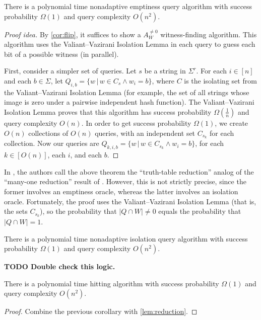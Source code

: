 \documentclass{article}
\newcommand{\todo}[1]{\textbf{TODO #1}}
\begin{document}
\begin{theorem}
  There is a polynomial time nonadaptive emptiness query algorithm with success probability $\Omega(1)$ and query complexity $O(n^2)$.
\end{theorem}
\begin{proof}[Proof idea]
  By \autoref{cor:flip}, it suffices to show a $A_W^{\neq 0}$ witness-finding algorithm.
  This algorithm uses the Valiant--Vazirani Isolation Lemma in each query to guess each bit of a possible witness (in parallel).

  First, consider a simpler set of queries.
  Let $s$ be a string in $\Sigma^r$.
  For each $i \in [n]$ and each $b \in \Sigma$, let $Q_{i, b} = \{ w \, | \, w \in C_s \land w_i = b\}$, where $C$ is the isolating set from the Valiant--Vazirani Isolation Lemma (for example, the set of all strings whose image is zero under a pairwise independent hash function).
  The Valiant--Vazirani Isolation Lemma proves that this algorithm has success probability $\Omega(\frac{1}{n})$ and query complexity $O(n)$.
  In order to get success probability $\Omega(1)$, we create $O(n)$ collections of $O(n)$ queries, with an independent set $C_{s_k}$ for each collection.
  Now our queries are $Q_{k, i, b} = \{ w \, | \, w \in C_{s_k} \land w_i = b\}$, for each $k \in \left[O(n)\right]$, each $i$, and each $b$.
\end{proof}

In \autocite{krw12}, the authors call the above theorem the ``truth-table reduction'' analog of the ``many-one reduction'' result of \autocite[Theorem~4.2]{dkvmw13}.
However, this is not strictly precise, since the former involves an emptiness oracle, whereas the latter involves an isolation oracle.
Fortunately, the proof uses the Valiant--Vazirani Isolation Lemma (that is, the sets $C_{s_k}$), so the probability that $|Q \cap W| \neq 0$ equals the probability that $|Q \cap W| = 1$.

\begin{corollary}
  There is a polynomial time nonadaptive isolation query algorithm with success probability $\Omega(1)$ and query complexity $O(n^2)$.
\end{corollary}

\todo{Double check this logic.}

\begin{corollary}
  There is a polynomial time hitting algorithm with success probability $\Omega(1)$ and query complexity $O(n^2)$.
\end{corollary}
\begin{proof}
  Combine the previous corollary with \autoref{lem:reduction}.
\end{proof}
\end{document}
